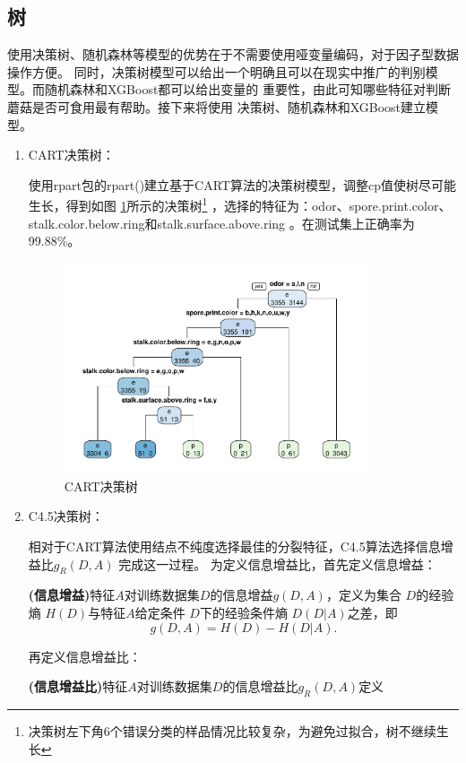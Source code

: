 \documentclass[lang=cn,11pt,a4paper,cite=super]{elegantpaper}
\begin{document}
\subsection{树}
使用决策树、随机森林等模型的优势在于不需要使用哑变量编码，对于因子型数据操作方便。
同时，决策树模型可以给出一个明确且可以在现实中推广的判别模型。而随机森林和XGBoost都可以给出变量的
重要性，由此可知哪些特征对判断蘑菇是否可食用最有帮助。接下来将使用
决策树、随机森林和XGBoost建立模型。
\begin{enumerate}
   \item CART决策树：\par  使用rpart包的rpart()建立基于CART算法的决策树模型，调整cp值使树尽可能生长，得到如图
   \ref{fig:cart}所示的决策树\footnote{决策树左下角6个错误分类的样品情况比较复杂，为避免过拟合，树不继续生长}
   ，选择的特征为：odor、spore.print.color、
   stalk.color.below.ring和stalk.surface.above.ring 。在测试集上正确率为99.88\%。
   \begin{figure}[htb]
      \centering
      \includegraphics[width=0.85\textwidth]{img/dt-1.pdf}
      \caption{CART决策树}
      \label{fig:cart}
   \end{figure}
   \item C4.5决策树：\par  相对于CART算法使用结点不纯度选择最佳的分裂特征，C4.5算法选择信息增益比$g_R(D,A)$
   完成这一过程。
   为定义信息增益比，首先定义信息增益：
   \begin{definition}
      \textbf{(信息增益)}特征$A$对训练数据集$D$的信息增益$g(D,A)$，定义为集合 $D$的经验熵 $H(D)$与特征$A$给定条件
       $D$下的经验条件熵 $D(D|A)$之差，即 $$g(D, A)=H(D)-H(D|A).$$
   \end{definition}
   再定义信息增益比：
   \begin{definition}
      \textbf{(信息增益比)}特征$A$对训练数据集$D$的信息增益比$g_R(D,A)$定义

\end{definition}
\end{enumerate}
\end{document}
